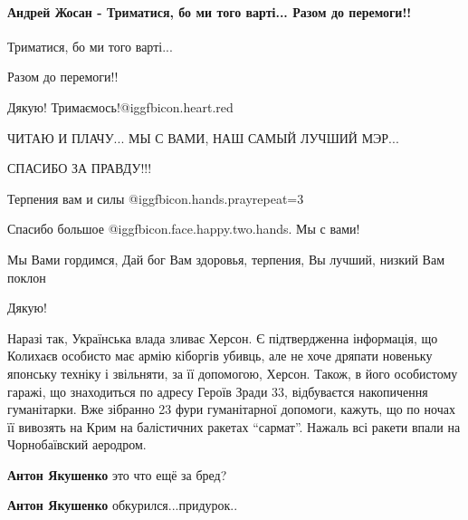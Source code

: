  
 
 
 
 
\paragraph{Андрей Жосан - Триматися, бо ми того варті... Разом до перемоги!!}

\begin{itemize} %

Триматися, бо ми того варті...

Разом до перемоги!!

Дякую! Тримаємось!@igg{fbicon.heart.red}


ЧИТАЮ И ПЛАЧУ... МЫ С ВАМИ, НАШ САМЫЙ ЛУЧШИЙ МЭР...

СПАСИБО ЗА ПРАВДУ!!!

Терпения вам и силы @igg{fbicon.hands.pray}{repeat=3} 

Спасибо большое  @igg{fbicon.face.happy.two.hands}. Мы с вами!

Мы Вами гордимся, Дай бог Вам здоровья, терпения, Вы лучший, низкий Вам поклон

Дякую!


Наразі так, Українська влада зливає Херсон. Є підтвердженна інформація, що
Колихаєв особисто має армію кіборгів убивць, але не хоче дряпати новеньку
японську техніку і звільняти, за її допомогою, Херсон. Також, в його особистому
гаражі, що знаходиться по адресу Героїв Зради 33, відбуваєтся накопичення
гуманітарки. Вже зібранно 23 фури гуманітарної допомоги, кажуть, що по ночах її
вивозять на Крим на балістичних ракетах \enquote{сармат}. Нажаль всі ракети впали на
Чорнобаївский аеродром.

\begin{itemize} %
\textbf{Антон Якушенко} это что ещё за бред?

\textbf{Антон Якушенко} обкурился...придурок..


\end{itemize}
\end{itemize}
